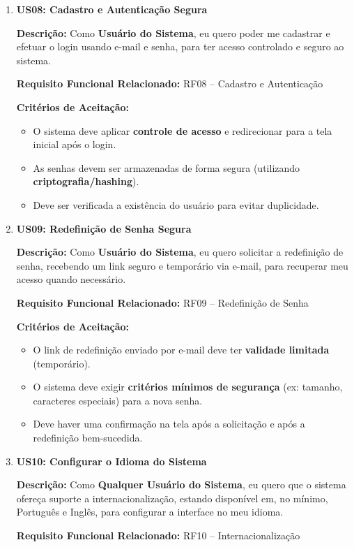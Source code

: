 \documentclass[
	12pt,				%
	openany,			%
	twoside,			%
	a4paper,			%
	english,			%
	brazil				%
	]{abntex2}
\begin{document}
\begin{enumerate}
\item \textbf{US08: Cadastro e Autenticação Segura}

\textbf{Descri\c{c}\~ao:} Como \textbf{Usuário do Sistema}, eu quero poder me cadastrar e efetuar o login usando e-mail e senha, para ter acesso controlado e seguro ao sistema.

\textbf{Requisito Funcional Relacionado:} RF08 -- Cadastro e Autenticação

\textbf{Crit\'erios de Aceita\c{c}\~ao:}
\begin{itemize}
  \item O sistema deve aplicar \textbf{controle de acesso} e redirecionar para a tela inicial após o login.
  \item As senhas devem ser armazenadas de forma segura (utilizando \textbf{criptografia/hashing}).
  \item Deve ser verificada a existência do usuário para evitar duplicidade.
\end{itemize}

\item \textbf{US09: Redefinição de Senha Segura}

\textbf{Descri\c{c}\~ao:} Como \textbf{Usuário do Sistema}, eu quero solicitar a redefinição de senha, recebendo um link seguro e temporário via e-mail, para recuperar meu acesso quando necessário.

\textbf{Requisito Funcional Relacionado:} RF09 -- Redefinição de Senha

\textbf{Crit\'erios de Aceita\c{c}\~ao:}
\begin{itemize}
  \item O link de redefinição enviado por e-mail deve ter \textbf{validade limitada} (temporário).
  \item O sistema deve exigir \textbf{critérios mínimos de segurança} (ex: tamanho, caracteres especiais) para a nova senha.
  \item Deve haver uma confirmação na tela após a solicitação e após a redefinição bem-sucedida.
\end{itemize}

\item \textbf{US10: Configurar o Idioma do Sistema}

\textbf{Descri\c{c}\~ao:} Como \textbf{Qualquer Usuário do Sistema}, eu quero que o sistema ofereça suporte a internacionalização, estando disponível em, no mínimo, Português e Inglês, para configurar a interface no meu idioma.

\textbf{Requisito Funcional Relacionado:} RF10 -- Internacionalização


\end{enumerate}
\end{document}
